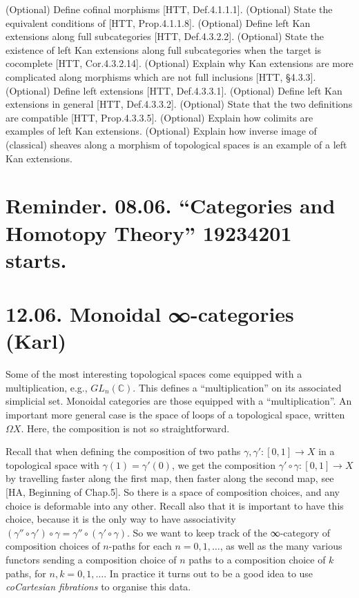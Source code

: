 \documentclass[a4paper]{amsart}
\numberwithin{figure}{section}
\theoremstyle{theorem}
\theoremstyle{definition}
\newcommand{\CC}{\mathbb{C}}
\begin{document}
(Optional) Define cofinal morphisms [HTT, Def.4.1.1.1]. %
(Optional) State the equivalent conditions of [HTT, Prop.4.1.1.8]. %
(Optional) Define left Kan extensions along full subcategories [HTT, Def.4.3.2.2]. %
(Optional) State the existence of left Kan extensions along full subcategories when the target is cocomplete [HTT, Cor.4.3.2.14].
(Optional) Explain why Kan extensions are more complicated along morphisms which are not full inclusions [HTT, §4.3.3]. %
(Optional) Define left extensions [HTT, Def.4.3.3.1]. %
(Optional) Define left Kan extensions in general [HTT, Def.4.3.3.2]. %
(Optional) State that the two definitions are compatible [HTT, Prop.4.3.3.5]. %
(Optional) Explain how colimits are examples of left Kan extensions. %
(Optional) Explain how inverse image of (classical) sheaves along a morphism of topological spaces is an example of a left Kan extensions. %




\section*{Reminder. 08.06. ``Categories and Homotopy Theory'' 19234201 starts.}

\section{12.06. Monoidal ∞-categories (Karl)} %

Some of the most interesting topological spaces come equipped with a multiplication, e.g., $GL_n(\CC)$. This defines a ``multiplication'' on its associated simplicial set. Monoidal categories are those equipped with a ``multiplication''. An important more general case is the space of loops of a topological space, written $\Omega X$. Here, the composition is not so straightforward.

Recall that when defining the composition of two paths $\gamma, \gamma': [0, 1] \to X$ in a topological space with $\gamma(1) = \gamma'(0)$, we get the composition $\gamma'\circ \gamma: [0,1] \to X$ by travelling faster along the first map, then faster along the second map, see [HA, Beginning of Chap.5]. So there is a space of composition choices, and any choice is deformable into any other. Recall also that it is important to have this choice, because it is the only way to have associativity $(\gamma'' \circ \gamma') \circ \gamma = \gamma'' \circ (\gamma' \circ \gamma)$. So we want to keep track of the ∞-category of composition choices of $n$-paths for each $n = 0, 1, \dots$, as well as the many various functors sending a composition choice of $n$ paths to a composition choice of $k$ paths, for $n, k = 0, 1, \dots$. In practice it turns out to be a good idea to use \emph{coCartesian fibrations} to organise this data.
\end{document}

